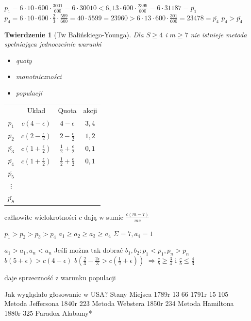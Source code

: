 \documentclass[12pt,a4paper]{article}
\theoremstyle{break}
\newtheorem{theorem}{Twierdzenie}[section]
\begin{document}
	$p_1=6\cdot10\cdot600\cdot\frac{3001}{600}=6\cdot30010<6,13\cdot600\cdot\frac{2399}{600}=6\cdot31187=\bar{p_1}$
	$p_4=6\cdot10\cdot600\cdot\frac{2}{3}\cdot\frac{599}{600}=40\cdot5599=23960>6\cdot13\cdot600\cdot\frac{301}{600}=23478=\bar{p_4}$
	$p_4>\bar{p_4}$
	
	\begin{theorem}[Tw Balińskiego-Younga]
		Dla $S\geq 4$ i $m\geq 7$ nie istnieje metoda spełniająca jednocześnie warunki \begin{itemize}
			\item quoty
			\item monotniczności
			\item populacji
		\end{itemize}
	\end{theorem}
	
	\begin{tabular}{c|c|c|c}
		&Układ&Quota&akcji\\
		$\bar{p_1}$&$c(4-\epsilon)$&$4-\epsilon$&$3,4$\\
		$\bar{p_2}$&$c(2-\frac{\epsilon}{2})$&$2-\frac{\epsilon}{2}$&$1,2$\\
		$\bar{p_3}$&$c(1+\frac{\epsilon}{2})$&$\frac{1}{2}+\frac{\epsilon}{2}$&$0,1$\\
		$\bar{p_4}$&$c(1+\frac{\epsilon}{2})$&$\frac{1}{2}+\frac{\epsilon}{2}$&$0,1$\\
		$\bar{p_5}$&&&\\
		$\vdots$&&&\\
		$\bar{p_S}$&&&\\
	\end{tabular}
	całkowite wielokrotności $c$ dają w sumie $\frac{c(m-7)}{mc}$
	
	$\bar{p_1}>\bar{p_2}>\bar{p_3}>\bar{p_4}$
	$\bar{a_1}\geq\bar{a_2}\geq\bar{a_3}\geq\bar{a_4}$
	$\Sigma = 7,\bar{a_4}=1$
	
	$a_1>\bar{a_1}, a_n<\bar{a_n}$
	Jeśli można tak dobrać $b_1, b_2: p_1<\bar{p_1}, p_n>\bar{p_n}$
	$b(5+\epsilon)>c(4-\epsilon)$
	$b(\frac{2}{3}-\frac{2\epsilon}{3}>c(\frac{1}{2}+\epsilon))$
	$\Rightarrow \frac{c}{b}\geq \frac{3}{4}$ i $\frac{c}{b}\leq \frac{4}{3}$
	
	daje sprzeczność z warunku populacji
	 
	
	\vspace{3cm}
	
	
	Jak wyglądało głosowanie w USA?
			Stany	Miejsca
	1789r 	13		66
	1791r	15		105		Metoda Jeffersona
	1840r			223		Metoda Webstera
	1850r			234		Metoda Hamiltona
	1880r			325		Paradox Alabamy*
	
\end{document}
